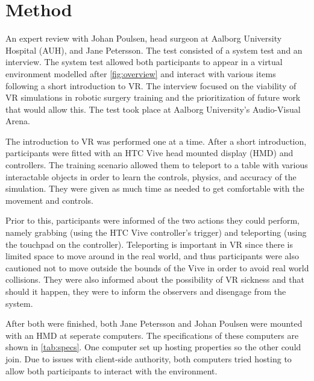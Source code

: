 \documentclass[conference]{IEEEtran}
\begin{document}
\section{Method}
An expert review with Johan Poulsen, head surgeon at Aalborg University Hospital (AUH), and Jane Petersson. The test consisted of a system test and an interview. The system test allowed both participants to appear in a virtual environment modelled after \autoref{fig:overview} and interact with various items following a short introduction to VR. The interview focused on the viability of VR simulations in robotic surgery training and the prioritization of future work that would allow this. The test took place at Aalborg University's Audio-Visual Arena.

The introduction to VR was performed one at a time. After a short introduction, participants were fitted with an HTC Vive head mounted display (HMD) and controllers. The training scenario allowed them to teleport to a table with various interactable objects in order to learn the controls, physics, and accuracy of the simulation. They were given as much time as needed to get comfortable with the movement and controls.

Prior to this, participants were informed of the two actions they could perform, namely grabbing (using the HTC Vive controller's trigger) and teleporting (using the touchpad on the controller). Teleporting is important in VR since there is limited space to move around in the real world, and thus participants were also cautioned not to move outside the bounds of the Vive in order to avoid real world collisions. They were also informed about the possibility of VR sickness and that should it happen, they were to inform the observers and disengage from the system\citep{barrett_side_2004}.

After both were finished, both Jane Petersson and Johan Poulsen were mounted with an HMD at seperate computers. The specifications of these computers are shown in \autoref{tab:specs}. One computer set up hosting properties so the other could join. Due to issues with client-side authority, both computers tried hosting to allow both participants to interact with the environment.
\end{document}

